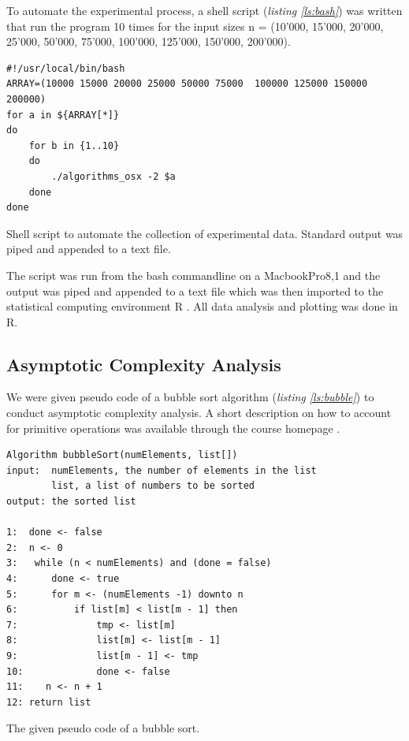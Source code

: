 \documentclass[a4paper,11pt,twoside]{article}
\begin{document}
To automate the experimental process, a shell script (\textit{listing \ref{ls:bash}}) 
was written that run the program 10 times for the input sizes n =
(10'000, 15'000, 20'000, 25'000, 50'000, 75'000, 100'000,
125'000, 150'000, 200'000).

\begin{listing}

\begin{verbatim}
#!/usr/local/bin/bash                                                                                           
ARRAY=(10000 15000 20000 25000 50000 75000  100000 125000 150000 200000)
for a in ${ARRAY[*]}
do
    for b in {1..10}
    do
        ./algorithms_osx -2 $a
    done
done
\end{verbatim}
\caption{Shell script to automate the collection of experimental
  data. Standard output was piped and appended to a text file.\label{ls:bash}}
\end{listing}

The script was run from the bash commandline on a MacbookPro8,1 and
the output was piped and appended to a text file which was then imported
to the statistical computing environment R \cite{rlanguage}. All data analysis and
plotting was done in R. 


\subsection{Asymptotic Complexity Analysis}
We were given pseudo code of a bubble sort algorithm (\textit{listing \ref{ls:bubble}})
to conduct asymptotic complexity analysis. A short description on how
to account for primitive operations was available through the course
homepage \cite{complex}.

\begin{listing}
\begin{verbatim}
Algorithm bubbleSort(numElements, list[])
input:  numElements, the number of elements in the list
        list, a list of numbers to be sorted
output: the sorted list

1:  done <- false
2:  n <- 0
3:   while (n < numElements) and (done = false)
4:      done <- true
5:      for m <- (numElements -1) downto n
6:          if list[m] < list[m - 1] then
7:              tmp <- list[m]
8:              list[m] <- list[m - 1]
9:              list[m - 1] <- tmp
10:             done <- false
11:    n <- n + 1
12: return list 
\end{verbatim}
\caption{The given pseudo code of a bubble sort.}
\end{listing}
\end{document}
